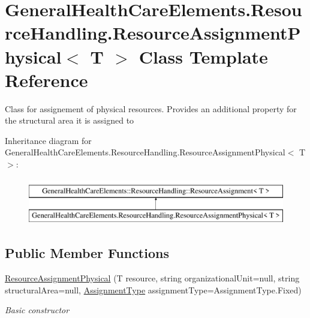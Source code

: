 \hypertarget{class_general_health_care_elements_1_1_resource_handling_1_1_resource_assignment_physical}{}\section{General\+Health\+Care\+Elements.\+Resource\+Handling.\+Resource\+Assignment\+Physical$<$ T $>$ Class Template Reference}
\label{class_general_health_care_elements_1_1_resource_handling_1_1_resource_assignment_physical}


Class for assignement of physical resources. Provides an additional property for the structural area it is assigned to  


Inheritance diagram for General\+Health\+Care\+Elements.\+Resource\+Handling.\+Resource\+Assignment\+Physical$<$ T $>$\+:\begin{figure}[H]
\begin{center}
\leavevmode
\includegraphics[height=2.000000cm]{class_general_health_care_elements_1_1_resource_handling_1_1_resource_assignment_physical}
\end{center}
\end{figure}
\subsection*{Public Member Functions}
\begin{DoxyCompactItemize}
\item 
\hyperlink{class_general_health_care_elements_1_1_resource_handling_1_1_resource_assignment_physical_ae9e1fce9b16c043da45387bc91333333}{Resource\+Assignment\+Physical} (T resource, string organizational\+Unit=null, string structural\+Area=null, \hyperlink{namespace_enums_ac8e46c12834f4cb6a641854bd0676221}{Assignment\+Type} assignment\+Type=Assignment\+Type.\+Fixed)
\begin{DoxyCompactList}\small\item\em Basic constructor \end{DoxyCompactList}\end{DoxyCompactItemize}
